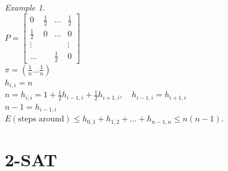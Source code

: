\documentclass[a4paper, 12pt]{book}
\theoremstyle{definition}
\theoremstyle{remark}
\newtheorem*{ex}{Example}
\begin{document}

\begin{ex} \text{} \\
  $P = \begin{bmatrix}
    0 & \frac{1}{2} & \dots & \frac{1}{2} \\
    \frac{1}{2} & 0 & \dots & 0 \\
    \vdots & & & \vdots \\
    \dots & & \frac{1}{2} & 0
  \end{bmatrix}$ \\
  $\pi = (\frac{1}{n} \dots \frac{1}{n})$ \\
  $h_{i,i} = n$ \\
  $n = h_{i,i} = 1 + \frac{1}{2} h_{i-1,i} + \frac{1}{2} h_{i+1,i}, \quad h_{i-1,i} = h_{i+1,i}$ \\
  $n-1 = h_{i-1,i}$ \\
  $E(\text{steps around}) \leq h_{0,1} + h_{1,2} + \dots + h_{n-1,n} \leq n(n-1)$.
\end{ex}


\section{2-SAT}
\end{document}
